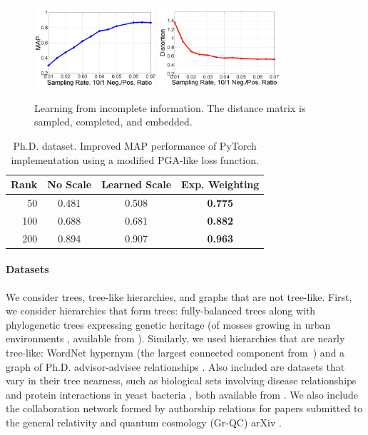 \begin{figure}
\centering
\includegraphics[width=0.4\textwidth]{figures/samplingMAP.png}
\includegraphics[width=0.4\textwidth]{figures/samplingDistortion.png}
\caption{Learning from incomplete information. The distance matrix is
  sampled, completed, and embedded.}
\label{fig:sampling}
\end{figure}



\begin{table}[]
\centering
\begin{tabular}{|r||c|c|c|}
\hline 
Rank  & No Scale  &  Learned Scale  &  Exp. Weighting \\    \hline    \hline
50 & 0.481 & 0.508 & {\bf 0.775} \\  \hline
100 & 0.688 & 0.681 & {\bf 0.882}\\ \hline
200 & 0.894 & 0.907 & {\bf 0.963}\\ \hline
\end{tabular}
\caption{Ph.D. dataset. Improved MAP performance of PyTorch implementation using a modified PGA-like loss function.}
\label{table:pytorch}
\end{table}

\paragraph*{Datasets}
We consider trees, tree-like hierarchies, and graphs that are not
tree-like. First, we consider hierarchies that form trees:
fully-balanced trees along with phylogenetic trees expressing genetic
heritage (of mosses growing in urban environments \cite{phylo-tree}, available from \cite{treebase}). Similarly, we used hierarchies that are nearly tree-like:
WordNet hypernym (the largest connected component from~\citet{fb}) and
a graph of Ph.D. advisor-advisee relationships \cite{de2011exploratory}. Also included are
datasets that vary in their tree nearness, such as biological sets
involving disease relationships \cite{goh2007human} and protein interactions in yeast
bacteria \cite{jeong2001lethality}, both available from \cite{nr}. We also include the collaboration network formed by authorship relations for papers submitted to the general relativity and quantum cosmology (Gr-QC) arXiv \cite{grqc}.

